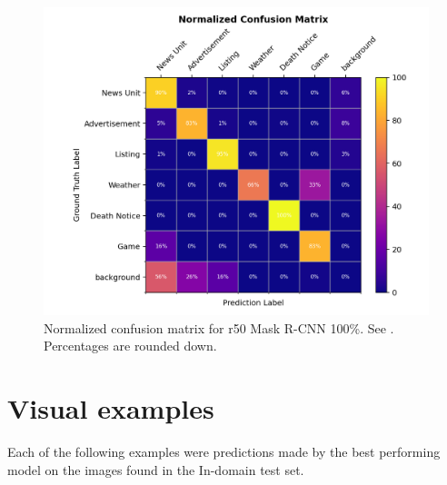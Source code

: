 \documentclass[oneside, english, bibtex]{kththesis}
\begin{document}
\begin{figure}[H]
\begin{adjustbox}{center,max size={\textwidth}{0.9\textheight}}
\parbox{1.5\textwidth}{\lineskip=0pt
  \centering
  \includegraphics[width=\linewidth, clip=true, trim = 0mm 0mm 0mm 0mm]{figures/confusions/vanilla_1.0_inset.png}
}
\end{adjustbox}
  \caption{Normalized confusion matrix for r50 Mask R-CNN 100\%. See . Percentages are rounded down.}
\label{fig:vanilla_1.0_inset_cm}
\end{figure}

\clearpage 

\section{Visual examples}
\label{sec:visex}

Each of the following examples were predictions made by the best performing model on the images found in the In-domain test set. 
\end{document}
